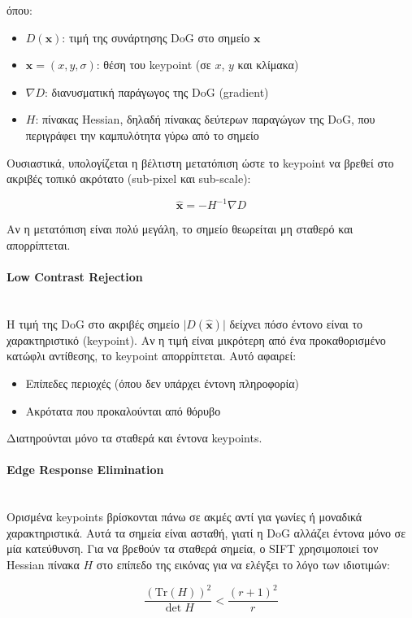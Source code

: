 \documentclass[12pt]{article}
\begin{document}
όπου:

\begin{itemize}
  \item $D(\mathbf{x})$: τιμή της συνάρτησης DoG στο σημείο $\mathbf{x}$
  \item $\mathbf{x} = (x,y,\sigma)$: θέση του keypoint (σε $x$, $y$ και κλίμακα)
  \item $\nabla D$: διανυσματική παράγωγος της DoG (gradient)
  \item $H$: πίνακας Hessian, δηλαδή πίνακας δεύτερων παραγώγων της DoG, που περιγράφει την καμπυλότητα γύρω από το σημείο
\end{itemize}

Ουσιαστικά, υπολογίζεται η βέλτιστη μετατόπιση ώστε το keypoint να βρεθεί στο ακριβές τοπικό ακρότατο (sub-pixel και sub-scale):

\[
\hat{\mathbf{x}} = - H^{-1} \nabla D
\]

Αν η μετατόπιση είναι πολύ μεγάλη, το σημείο θεωρείται μη σταθερό και απορρίπτεται.


\paragraph{Low Contrast Rejection}
\mbox{}\\ 
Η τιμή της DoG στο ακριβές σημείο $\lvert D(\hat{\mathbf{x}}) \rvert$ δείχνει πόσο έντονο είναι το χαρακτηριστικό (keypoint). 
Αν η τιμή είναι μικρότερη από ένα προκαθορισμένο κατώφλι αντίθεσης, το keypoint απορρίπτεται. Αυτό αφαιρεί:

\begin{itemize}
  \item Επίπεδες περιοχές (όπου δεν υπάρχει έντονη πληροφορία)
  \item Ακρότατα που προκαλούνται από θόρυβο
\end{itemize}
Διατηρούνται μόνο τα σταθερά και έντονα keypoints.

\paragraph{Edge Response Elimination}
\mbox{}\\
Ορισμένα keypoints βρίσκονται πάνω σε ακμές αντί για γωνίες ή μοναδικά χαρακτηριστικά. Αυτά τα σημεία είναι ασταθή, γιατί η DoG αλλάζει έντονα μόνο σε
μία κατεύθυνση. Για να βρεθούν τα σταθερά σημεία, ο SIFT χρησιμοποιεί τον Hessian πίνακα $H$ στο επίπεδο της εικόνας για να ελέγξει το λόγο των ιδιοτιμών:

\[
\frac{(\mathrm{Tr}(H))^2}{\det H} < \frac{(r+1)^2}{r}
\]
\end{document}

